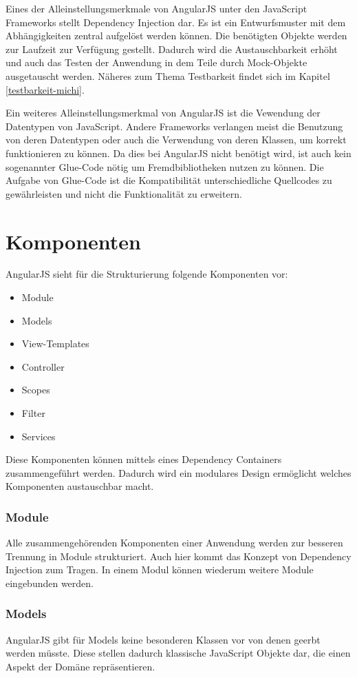 Eines der Alleinstellungsmerkmale von AngularJS unter den JavaScript Frameworks stellt Dependency Injection dar.
Es ist ein Entwurfsmuster mit dem Abhängigkeiten zentral aufgelöst werden können.
Die benötigten Objekte werden zur Laufzeit zur Verfügung gestellt.
Dadurch wird die Austauschbarkeit erhöht und auch das Testen der Anwendung in dem Teile durch Mock-Objekte ausgetauscht werden.
Näheres zum Thema Testbarkeit findet sich im Kapitel \ref{testbarkeit-michi}.

Ein weiteres Alleinstellungsmerkmal von AngularJS ist die Vewendung der Datentypen von JavaScript.
Andere Frameworks verlangen meist die Benutzung von deren Datentypen oder auch die Verwendung von deren Klassen, um korrekt funktionieren zu können.
Da dies bei AngularJS nicht benötigt wird, ist auch kein sogenannter Glue-Code nötig um Fremdbibliotheken nutzen zu können.
Die Aufgabe von Glue-Code ist die Kompatibilität unterschiedliche Quellcodes zu gewährleisten und nicht die Funktionalität zu erweitern.


\section{Komponenten}
AngularJS sieht für die Strukturierung folgende Komponenten vor:
\begin{itemize}
	\item Module
	\item Models
	\item View-Templates
	\item Controller
	\item Scopes
	\item Filter
	\item Services
\end{itemize}
Diese Komponenten können mittels eines Dependency Containers zusammengeführt werden.
Dadurch wird ein modulares Design ermöglicht welches Komponenten austauschbar macht.

\subsubsection{Module}
Alle zusammengehörenden Komponenten einer Anwendung werden zur besseren Trennung in Module strukturiert.
Auch hier kommt das Konzept von Dependency Injection zum Tragen.
In einem Modul können wiederum weitere Module eingebunden werden.

\subsubsection{Models}
AngularJS gibt für Models keine besonderen Klassen vor von denen geerbt werden müsste.
Diese stellen dadurch klassische JavaScript Objekte dar, die einen Aspekt der Domäne repräsentieren.

